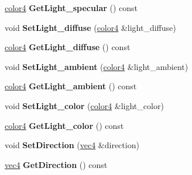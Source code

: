 \begin{DoxyCompactItemize}
\item 
\hypertarget{class_light_source_ab91668c8a2b5e9af25df5e96aef8f930}{\hyperlink{struct_angel_1_1vec4}{color4} {\bfseries Get\-Light\-\_\-specular} () const }\label{class_light_source_ab91668c8a2b5e9af25df5e96aef8f930}

\item 
\hypertarget{class_light_source_a6ecf874ed5a2c0796435a4d7fe7f3d5c}{void {\bfseries Set\-Light\-\_\-diffuse} (\hyperlink{struct_angel_1_1vec4}{color4} \&light\-\_\-diffuse)}\label{class_light_source_a6ecf874ed5a2c0796435a4d7fe7f3d5c}

\item 
\hypertarget{class_light_source_a3b1b4a97762e1cbb51c529166c82f657}{\hyperlink{struct_angel_1_1vec4}{color4} {\bfseries Get\-Light\-\_\-diffuse} () const }\label{class_light_source_a3b1b4a97762e1cbb51c529166c82f657}

\item 
\hypertarget{class_light_source_aabc855fe2998ed9af76c9e3c262d9e5c}{void {\bfseries Set\-Light\-\_\-ambient} (\hyperlink{struct_angel_1_1vec4}{color4} \&light\-\_\-ambient)}\label{class_light_source_aabc855fe2998ed9af76c9e3c262d9e5c}

\item 
\hypertarget{class_light_source_a87b3948456c4d45caa24b7cdd1e02058}{\hyperlink{struct_angel_1_1vec4}{color4} {\bfseries Get\-Light\-\_\-ambient} () const }\label{class_light_source_a87b3948456c4d45caa24b7cdd1e02058}

\item 
\hypertarget{class_light_source_aab4e16f4fabe4fffd9ca614669468b18}{void {\bfseries Set\-Light\-\_\-color} (\hyperlink{struct_angel_1_1vec4}{color4} \&light\-\_\-color)}\label{class_light_source_aab4e16f4fabe4fffd9ca614669468b18}

\item 
\hypertarget{class_light_source_a4e949920966cef628098f5f2199595f2}{\hyperlink{struct_angel_1_1vec4}{color4} {\bfseries Get\-Light\-\_\-color} () const }\label{class_light_source_a4e949920966cef628098f5f2199595f2}

\item 
\hypertarget{class_light_source_aa56fb7f92dffb9640671e3175a2e02d6}{void {\bfseries Set\-Direction} (\hyperlink{struct_angel_1_1vec4}{vec4} \&direction)}\label{class_light_source_aa56fb7f92dffb9640671e3175a2e02d6}

\item 
\hypertarget{class_light_source_a6387fc88c608069ce983a55d88d2bc80}{\hyperlink{struct_angel_1_1vec4}{vec4} {\bfseries Get\-Direction} () const }\label{class_light_source_a6387fc88c608069ce983a55d88d2bc80}


\end{DoxyCompactItemize}
